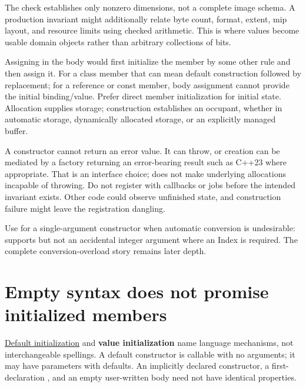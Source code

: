 The check establishes only nonzero dimensions, not a complete image schema. A production invariant might additionally relate byte count, format, extent, mip layout, and resource limits using checked arithmetic. This is where values become usable domain objects rather than arbitrary collections of bits.

Assigning  in the body would first initialize the member by some other rule and then assign it. For a class member that can mean default construction followed by replacement; for a reference or const member, body assignment cannot provide the initial binding/value. Prefer direct member initialization for initial state. Allocation supplies storage; construction establishes an occupant, whether in automatic storage, dynamically allocated storage, or an explicitly managed buffer.

A constructor cannot return an error value. It can throw, or creation can be mediated by a factory returning an error-bearing result such as C++23  where appropriate. That is an interface choice;  does not make underlying allocations incapable of throwing. Do not register  with callbacks or jobs before the intended invariant exists. Other code could observe unfinished state, and construction failure might leave the registration dangling.

Use  for a single-argument constructor when automatic conversion is undesirable:  supports  but not an accidental integer argument where an Index is required. The complete conversion-overload story remains later depth.

\section{Empty syntax does not promise initialized members}\label{01-foundations-i-ch003-empty-syntax-does-not-promise-initialized-members}

\hypertarget{01-foundations-i-ch003-empty-syntax-does-not-promise-initialized-members}{}

\hyperref[appendix-ba8c1a9fe03f]{Default initialization} and \textbf{value initialization} name language mechanisms, not interchangeable spellings. A default constructor is callable with no arguments; it may have parameters with defaults. An implicitly declared constructor, a first-declaration , and an empty user-written body need not have identical properties.

